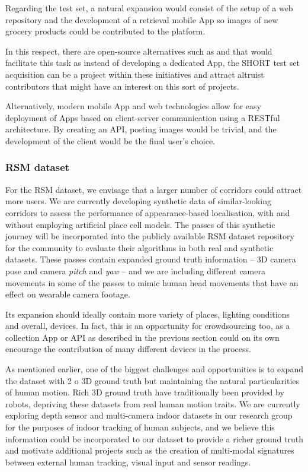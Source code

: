 Regarding the test set, a natural expansion would consist of the setup of a web repository and the development of a retrieval mobile App so images of new grocery products could be contributed to the platform.

In this respect, there are open-source alternatives such as \cite{apple} and \cite{google} that would facilitate this task as instead of developing a dedicated App, the SHORT test set acquisition can be a project within these initiatives and attract altruist contributors that might have an interest on this sort of projects.

Alternatively, modern mobile App and web technologies allow for easy deployment of Apps based on client-server communication using a RESTful architecture. By creating an API, posting images would be trivial, and the development of the client would be the final user's choice.

\subsubsection{RSM dataset}
\label{sec:futureRSM}
For the RSM dataset, we envisage that a larger number of corridors could attract more users. We are currently developing synthetic data of similar-looking corridors to assess the performance of appearance-based localisation, with and without employing artificial place cell models. The passes of this synthetic journey will be incorporated into the publicly available RSM dataset repository for the community to evaluate their algorithms in both real and synthetic datasets. These passes contain expanded ground truth information -- 3D camera pose and camera \textit{pitch} and \textit{yaw} --  and we are including different camera movements in some of the passes to mimic human head movements that have an effect on wearable camera footage.

Its expansion should ideally contain more variety of places, lighting conditions and overall, devices. In fact, this is an opportunity for crowdsourcing too, as a collection App or API as described in the previous section could on its own encourage the contribution of many different devices in the process.

As mentioned earlier, one of the biggest challenges and opportunities is to expand the dataset with 2 o 3D ground truth but maintaining the natural particularities of human motion. Rich 3D ground truth have traditionally been provided by robots, depriving these datasets from real human motion traits. We are currently exploring depth sensor and multi-camera indoor datasets in our research group for the purposes of indoor tracking of human subjects, and we believe this information could be incorporated to our dataset to provide a richer ground truth and motivate additional projects such as the creation of multi-modal signatures between external human tracking, visual input and sensor readings.

